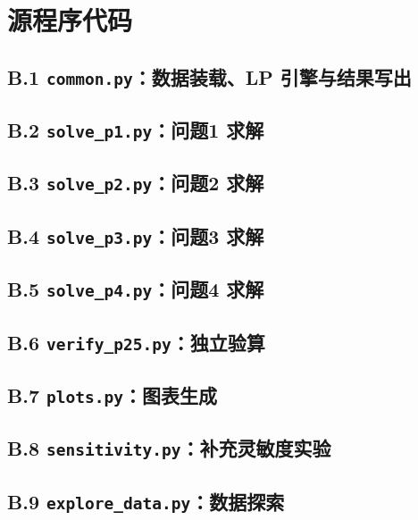 \clearpage
\section{源程序代码}

\subsection*{B.1 \texttt{common.py}：数据装载、LP 引擎与结果写出}


\subsection*{B.2 \texttt{solve\_p1.py}：问题1 求解}


\subsection*{B.3 \texttt{solve\_p2.py}：问题2 求解}


\subsection*{B.4 \texttt{solve\_p3.py}：问题3 求解}


\subsection*{B.5 \texttt{solve\_p4.py}：问题4 求解}


\subsection*{B.6 \texttt{verify\_p25.py}：独立验算}


\subsection*{B.7 \texttt{plots.py}：图表生成}


\subsection*{B.8 \texttt{sensitivity.py}：补充灵敏度实验}


\subsection*{B.9 \texttt{explore\_data.py}：数据探索}

